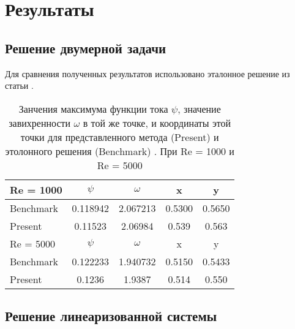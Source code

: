 \section*{Результаты}
\subsection*{Решение двумерной задачи}

Для сравнения полученных результатов использовано эталонное решение из статьи \cite{2DBench}. 

\begin{table}[htp]
\center
  \begin{tabular}{lcccc}
\hline
	Re = 1000 
		& $\psi$   	& $\omega$ 	& x 		& y \\
\hline	
	Benchmark 	& 0.118942 	& 2.067213 	& 0.5300   	& 0.5650 \\
	Present		& 0.11523	& 2.06984	& 0.539		& 0.563 \\
\hline 
\hline
	Re = 5000 
		& $\psi$   	& $\omega$ 	& x 		& y \\
\hline	
	Benchmark 	& 0.122233 	& 1.940732 	& 0.5150   	& 0.5433 \\
	Present		& 0.1236	& 1.9387	& 0.514		& 0.550 \\
\hline 
  \end{tabular}
\caption{Занчения максимума функции тока $\psi$, значение завихренности $\omega$ в той же точке, и координаты этой точки для представленного 
метода (Present) и этолонного решения (Benchmark) \cite{2DBench}. При Re = 1000 и Re = 5000}
\label{comp}
\end{table}



\subsection*{Решение линеаризованной системы} 

